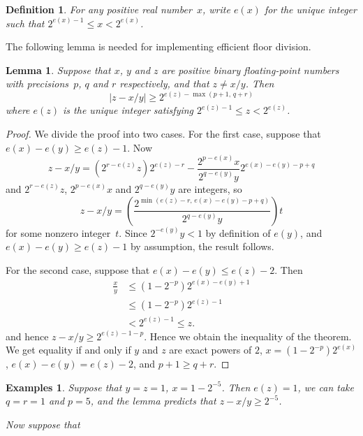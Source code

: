 \documentclass{article}
\newtheorem{lemma}{Lemma}
\newtheorem{definition}{Definition}
\newtheorem{examples}{Examples}
\newcommand{\abs}[1]{|#1|}
\begin{document}
\begin{definition}
  For any positive real number~$x$, write $e(x)$ for the unique
  integer such that $2^{e(x)-1} \le x < 2^{e(x)}$.
\end{definition}

The following lemma is needed for implementing efficient floor division.

\begin{lemma}
  Suppose that $x$, $y$ and $z$ are positive binary floating-point
  numbers with precisions~$p$, $q$ and $r$ respectively, and that $z
  \ne x/y$.  Then
  $$\abs{z-x/y} \ge 2^{e(z) - \max(p+1,\,q+r)}$$ where $e(z)$ is the
  unique integer satisfying $2^{e(z)-1} \le z < 2^{e(z)}$.
\end{lemma}

\begin{proof}
  We divide the proof into two cases.  For the first case, suppose
  that $e(x)-e(y) \ge e(z)-1$.  Now
  $$z-x/y = (2^{r-e(z)}z)2^{e(z)-r} - \frac{2^{p-e(x)}x}{2^{q-e(y)}y}
  2^{e(x)-e(y)-p+q}$$ and $2^{r-e(z)}z$, $2^{p-e(x)}x$ and
  $2^{q-e(y)}y$ are integers, so
  $$z-x/y = \left(\frac{2^{\min(e(z)-r,\,
      e(x)-e(y)-p+q)}}{2^{q-e(y)}y}\right)t$$ for some nonzero
  integer~$t$.  Since $2^{-e(y)}y < 1$ by definition of $e(y)$, and
  $e(x)-e(y)\ge e(z)-1$ by assumption, the result follows.

  For the second case, suppose that $e(x) - e(y) \le e(z)-2$.
  Then
  \begin{align*}
    \frac xy&\le (1-2^{-p})2^{e(x)-e(y)+1}\\
      &\le(1-2^{-p})2^{e(z)-1}\\
      &< 2^{e(z)-1} \le z.
  \end{align*}
  and hence $z-x/y \ge 2^{e(z)-1-p}$.  Hence we obtain the inequality
  of the theorem.  We get equality if and only if $y$ and $z$ are
  exact powers of $2$, $x = (1-2^{-p})2^{e(x)}$, $e(x)-e(y) = e(z)-2$,
  and $p+1\ge q+r$.
\end{proof}

\begin{examples}
  Suppose that $y=z=1$, $x = 1-2^{-5}$.  Then $e(z) = 1$,
  we can take $q=r=1$ and $p=5$, and the lemma predicts that $z-x/y \ge
  2^{-5}$.

  Now suppose that

\end{examples}
\end{document}
